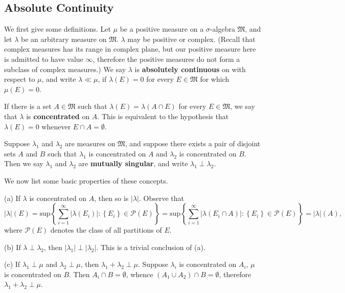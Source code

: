 \subsection{Absolute Continuity}
We first give some definitions. Let $\mu$ be a positive measure on a $\sigma$-algebra $\mathfrak{M}$, and let $\lambda$ be an arbitrary measure on $\mathfrak{M}$. $\lambda$ may be positive or complex. (Recall that complex measures has its range in complex plane, but our positive measure here is admitted to have value $\infty$, therefore the positive measures do not form a subclass of complex measures.) We say $\lambda$ is \textbf{absolutely continuous} on with respect to $\mu$, and write $\lambda\ll\mu$, if $\lambda(E)=0$ for every $E\in\mathfrak{M}$ for which $\mu(E)=0$.\par
If there is a set $A\in\mathfrak{M}$ such that $\lambda(E)=\lambda(A\cap E)$ for every $E\in\mathfrak{M}$, we say that $\lambda$ is \textbf{concentrated} on $A$. This is equivalent to the hypothesis that $\lambda(E)=0$ whenever $E\cap A=\emptyset$.\par
Suppose $\lambda_1$ and $\lambda_2$ are measures on $\mathfrak{M}$, and suppose there exists a pair of disjoint sets $A$ and $B$ such that $\lambda_1$ is concentrated on $A$ and $\lambda_2$ is concentrated on $B$. Then we say $\lambda_1$ and $\lambda_2$ are \textbf{mutually singular}, and write $\lambda_1\perp\lambda_2$.\par
We now list some basic properties of these concepts.\par
(a) If $\lambda$ is concentrated on $A$, then so is $|\lambda|$. Observe that 
$$
\left| \lambda \right|\left( E \right) =\mathrm{sup}\left\{ \sum_{i=1}^{\infty}{\left| \lambda \left( E_i \right) \right|}:\left\{ E_i \right\} \in \mathcal{P} \left( E \right) \right\} =\mathrm{sup}\left\{ \sum_{i=1}^{\infty}{\left| \lambda \left( E_i\cap A \right) \right|}:\left\{ E_i \right\} \in \mathcal{P} \left( E \right) \right\} =\left| \lambda \right|\left( A \right) ,
$$
where $\mathcal{P}(E)$ denotes the class of all partitions of $E$.\par
(b) If $\lambda\perp\lambda_2$, then $|\lambda_1|\perp|\lambda_2|$. This is a trivial conclusion of (a).\par
(c) If $\lambda_1\perp\mu$ and $\lambda_2\perp\mu$, then $\lambda_1+\lambda_2\perp\mu$. Suppose $\lambda_i$ is concentrated on $A_i$, $\mu$ is concentrated on $B$. Then $A_i\cap B=\emptyset$, whence $(A_1\cup A_2)\cap B=\emptyset$, therefore $\lambda_1+\lambda_2\perp\mu$.\par
